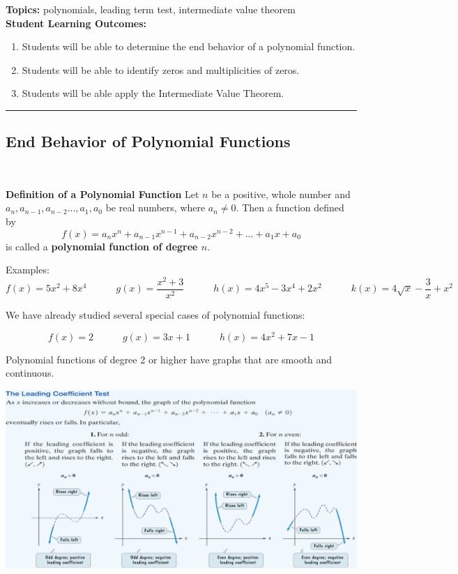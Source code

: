 
\noindent \textbf{Topics:}  polynomials, leading term test, intermediate value theorem\\

\noindent \textbf{Student Learning Outcomes:}
\begin{enumerate}
\item Students will be able to determine the end behavior of a polynomial function.
\item Students will be able to identify zeros and multiplicities of zeros.
\item Students will be able apply the Intermediate Value Theorem.

\end{enumerate}

\hrule 

\bigskip

\subsection{End Behavior of Polynomial Functions} ~

\begin{boxthm}
{\bf Definition of a Polynomial Function}
Let $n$ be a positive, whole number and $a_n,a_{n-1}, a_{n-2}...,a_1,a_0$ be real numbers, where $a_n\neq 0$.  Then a function defined by $$f(x)=a_nx^n+a_{n-1}x^{n-1}+a_{n-2}x^{n-2}+...+a_1x+a_0$$ is called a \textbf{polynomial function of degree $n$}.

\end{boxthm}


Examples:
$$f(x)=5x^2+8x^4 \quad \quad \quad g(x)=\frac{x^2+3}{x^2} \quad \quad \quad  h(x)=4x^5-3x^4+2x^2 \quad \quad \quad k(x)=4\sqrt{x}-\frac{3}{x} +x^2$$

\vfill
We have already studied several special cases of polynomial functions:

$$f(x)=2 \quad \quad \quad g(x)=3x+1 \quad \quad \quad  h(x)=4x^2+7x-1$$


\vfill

Polynomial functions of degree 2 or higher have graphs that are smooth and continuous.\\[.5in]


\clearpage

\includegraphics[scale=.95]{poly1}


